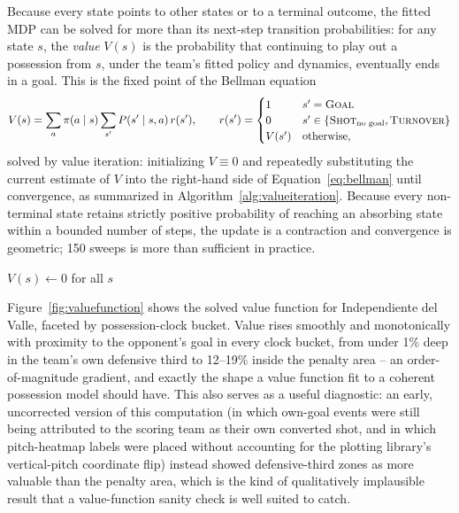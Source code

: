 \documentclass[11pt]{article}
\theoremstyle{plain}
\theoremstyle{definition}
\theoremstyle{remark}
\newcommand{\GOAL}{\textsc{Goal}}
\newcommand{\NOGOAL}{\textsc{Shot}_{\text{no goal}}}
\newcommand{\TURN}{\textsc{Turnover}}
\begin{document}
Because every state points to other states or to a terminal outcome, the fitted MDP can be solved for more than its next-step transition probabilities: for any state $s$, the \emph{value} $V(s)$ is the probability that continuing to play out a possession from $s$, under the team's fitted policy and dynamics, eventually ends in a goal. This is the fixed point of the Bellman equation
\begin{equation}
V(s) = \sum_{a} \pi(a \mid s) \sum_{s'} P(s' \mid s,a)\, r(s'), \qquad r(s') = \begin{cases} 1 & s' = \GOAL \\ 0 & s' \in \{\NOGOAL, \TURN\} \\ V(s') & \text{otherwise,} \end{cases}
\label{eq:bellman}
\end{equation}
solved by value iteration: initializing $V \equiv 0$ and repeatedly substituting the current estimate of $V$ into the right-hand side of Equation~\eqref{eq:bellman} until convergence, as summarized in Algorithm~\ref{alg:valueiteration}. Because every non-terminal state retains strictly positive probability of reaching an absorbing state within a bounded number of steps, the update is a contraction and convergence is geometric; 150 sweeps is more than sufficient in practice.

\begin{algorithm}[htbp]
\caption{Bellman value iteration for the possession-MDP value function}
\label{alg:valueiteration}
$V(s) \leftarrow 0$ for all $s$\;
\end{algorithm}

Figure~\ref{fig:valuefunction} shows the solved value function for Independiente del Valle, faceted by possession-clock bucket. Value rises smoothly and monotonically with proximity to the opponent's goal in every clock bucket, from under 1\% deep in the team's own defensive third to 12--19\% inside the penalty area -- an order-of-magnitude gradient, and exactly the shape a value function fit to a coherent possession model should have. This also serves as a useful diagnostic: an early, uncorrected version of this computation (in which own-goal events were still being attributed to the scoring team as their own converted shot, and in which pitch-heatmap labels were placed without accounting for the plotting library's vertical-pitch coordinate flip) instead showed defensive-third zones as more valuable than the penalty area, which is the kind of qualitatively implausible result that a value-function sanity check is well suited to catch.
\end{document}
